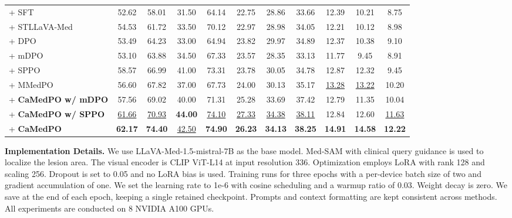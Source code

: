 \begin{table}[t]
{\begin{tabular}{lcccccccccc}
\midrule
+ SFT & 52.62 & 58.01 & 31.50 & 64.14 & 22.75 & 28.86 & 33.66 & 12.39 & 10.21 & 8.75 \\
\quad+ STLLaVA-Med & 54.53 & 61.72 & 33.50 & 70.12 & 22.97 & 28.98 & 34.05 & 12.21 & 10.12 & 8.98 \\
\quad + DPO & 53.49 & 64.23 & 33.00 & 64.94 & 23.82 & 29.97 & 34.89 & 12.37 & 10.38 & 9.10 \\
\quad+ mDPO & 53.10 & 63.88 & 34.50 & 67.33 & 23.57 & 28.35 & 33.13 & 11.77 & 9.45 & 8.91 \\
\quad+ SPPO & 58.57 & 66.99 & 41.00 & 73.31 & 23.78 & 30.05 & 34.78 & 12.87 & 12.32 & 9.45 \\
\quad+ MMedPO & 56.60 & 67.82 & 37.00 & 67.73 & 24.00 & 30.13 & 35.17 & \underline{13.28} & \underline{13.22} & 10.20 \\
\rowcolor{cyan!7}
\quad+ \textbf{CaMedPO w/ mDPO} & 57.56 & 69.02 & 40.00 & 71.31 & 25.28 & 33.69 & 37.42 & 12.79 & 11.35 & 10.04 \\
\rowcolor{cyan!7}
\quad+ \textbf{CaMedPO w/ SPPO} & \underline{61.66} & \underline{70.93} & \textbf{44.00} & \underline{74.10} & \underline{27.33} & \underline{34.38} & \underline{38.11} & 12.84 & 12.60 & \underline{11.63} \\
\rowcolor{cyan!7}
\quad+ \textbf{CaMedPO} & \textbf{62.17} & \textbf{74.40} & \underline{42.50} & \textbf{74.90} & \textbf{26.23} & \textbf{34.13} & \textbf{38.25} & \textbf{14.91} & \textbf{14.58} & \textbf{12.22} \\
\bottomrule
\end{tabular}
}
\label{tab:main_results}
\end{table}

\noindent\textbf{Implementation Details.}
We use LLaVA-Med-1.5-mistral-7B \cite{Li2023LLaVAMed} as the base model. Med-SAM \cite{ma2024segment} with clinical query guidance is used to localize the lesion area. The visual encoder is CLIP ViT-L14 at input resolution 336. %
Optimization employs LoRA with rank 128 and scaling 256. Dropout is set to 0.05 and no LoRA bias is used. Training runs for three epochs with a per-device batch size of two and gradient accumulation of one. We set the learning rate to 1e-6 with cosine scheduling and a warmup ratio of 0.03. Weight decay is zero. We save at the end of each epoch, keeping a single retained checkpoint. Prompts and context formatting are kept consistent across methods. All experiments are conducted on 8 NVIDIA A100 GPUs.


